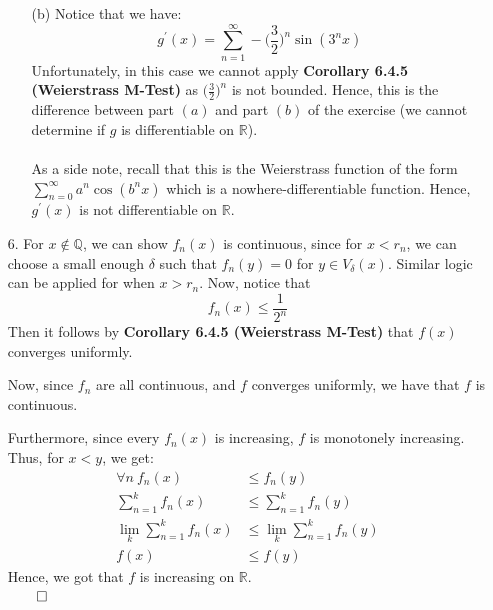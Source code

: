 \documentclass[11pt]{article}
\newcommand{\reals}{\mathbb{R}}
\begin{document}
\begin{itemize}
\begin{itemize}
            \item[(b)]
                Notice that we have:
                \begin{equation*}
                    g^\prime(x) =
                        \sum_{n = 1}^\infty
                            -\Big(\frac{3}{2}\Big)^n\sin{(3^nx)}
                \end{equation*}
                Unfortunately, in this case we cannot apply \textbf{Corollary
                6.4.5 (Weierstrass M-Test)} as $\Big(\frac{3}{2}\Big)^n$ is not
                bounded. Hence, this is the difference between part $(a)$ and
                part $(b)$ of the exercise (we cannot determine if $g$ is
                differentiable on $\reals$).
                \\
                \\
                As a side note, recall that this is the Weierstrass function of
                the form $\sum_{n = 0}^\infty a^n\cos{(b^nx)}$ which is a
                nowhere-differentiable function. Hence, $g^\prime(x)$ is not
                differentiable on $\reals$.
        \end{itemize}

    \item[6.]
        For $x \not\in \mathbb{Q}$, we can show $f_n(x)$ is continuous, since
        for $x < r_n$, we can choose a small enough $\delta$ such that $f_n(y)
        = 0$ for $y \in V_\delta(x)$. Similar logic can be applied for when $x
        > r_n$.
        Now, notice that
        \begin{equation*}
            f_n(x) \leq \frac{1}{2^n}
        \end{equation*}
        Then it follows by \textbf{Corollary 6.4.5 (Weierstrass M-Test)} that
        $f(x)$ converges uniformly.

        Now, since $f_n$ are all continuous, and $f$ converges uniformly, we
        have that $f$ is continuous.

        Furthermore, since every $f_n(x)$ is increasing, $f$ is monotonely
        increasing. Thus, for $x < y$, we get:
        \begin{align*}
          \forall n\ f_n(x) &\leq f_n(y)\\
          \sum_{n = 1}^k f_n(x) &\leq \sum_{n = 1}^k f_n(y)\\
          \lim_k \sum_{n = 1}^k f_n(x) &\leq \lim_k \sum_{n = 1}^k f_n(y)\\
          f(x) &\leq f(y)
        \end{align*}
        Hence, we got that $f$ is increasing on $\reals$.\\
        $\qed$


\end{itemize}
\end{document}
